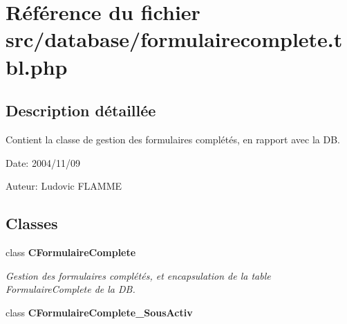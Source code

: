 \section{Référence du fichier src/database/formulairecomplete.tbl.php}
\label{formulairecomplete_8tbl_8php}


\subsection{Description détaillée}
Contient la classe de gestion des formulaires complétés, en rapport avec la DB. 

\begin{Desc}
\item[Date:]2004/11/09\end{Desc}
\begin{Desc}
\item[Auteur:]Ludovic FLAMME \end{Desc}


\subsection*{Classes}
\begin{CompactItemize}
\item 
class {\bf CFormulaireComplete}
\begin{CompactList}\small\item\em Gestion des formulaires complétés, et encapsulation de la table FormulaireComplete de la DB. \item\end{CompactList}\item 
class \textbf{CFormulaireComplete\_\-SousActiv}
\end{CompactItemize}

